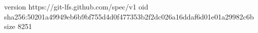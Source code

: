 version https://git-lfs.github.com/spec/v1
oid sha256:50201a49949eb6b9bf755d4d0f477353b2f2dc026a16ddaf6d01e01a29982c6b
size 8251
